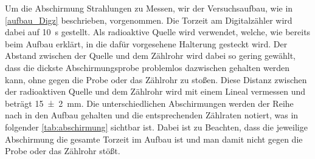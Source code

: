 \documentclass[12pt,english,ngerman]{scrartcl}
\begin{document}
Um die Abschirmung Strahlungen zu Messen, wir der Versuchsaufbau, wie in
\autoref{aufbau_Digz} beschrieben, vorgenommen. Die Torzeit am Digitalzähler
wird dabei auf \SI{10}{\second} gestellt. Als radioaktive Quelle wird
 verwendet, welche, wie bereits beim Aufbau erklärt, in die
dafür vorgesehene Halterung gesteckt wird. Der Abstand zwischen der Quelle und
dem Zählrohr wird dabei so gering gewählt, dass die dickste Abschirmungsprobe
problemlos dazwischen gehalten werden kann, ohne gegen die Probe oder das
Zählrohr zu stoßen. Diese Distanz zwischen der radioaktiven Quelle und dem
Zählrohr wird mit einem Lineal vermessen und beträgt \SI{15(2)}{\mm}. Die
unterschiedlichen Abschirmungen werden der Reihe nach in den Aufbau gehalten
und die entsprechenden Zählraten notiert, was in folgender
\autoref{tab:abschirmung} sichtbar ist. Dabei ist zu Beachten, dass die
jeweilige Abschirmung die gesamte Torzeit im Aufbau ist und man damit nicht
gegen die Probe oder das Zählrohr stößt.

\begin{table}[H]
  \caption[Erhaltene Zählraten bei verschiedenen Abschirmungsmaterialien]{Erhaltene Zählraten bei
  verschiedenen Abschirmungsmaterialien bei einer Torzeit von \SI{10}{\second} und einem
  Abstand der radioaktiven Quelle von \SI{15(2)}{\mm}. Die Unsicherheit beträgt dabei für alle Zählraten \SI{}{} \\
  \(z_{Luft} \dots\) erhaltene Zählrate ohne Abschirmung \\
  \(z_{\mathrm{Papier}} \dots\) erhaltene Zählrate mit einem Blatt Papier als Abschirmung \\
  \(z_{\mathrm{Lineal}} \dots\) erhaltene Zählrate mit einem Lineal als Abschirmung (Dicke = \SI{2.1(0.05)}{\mm})\\
  \(z_{\mathrm{Kunststoff}} \dots\) erhaltene Zählrate mit einer CD und zugehörigen Soulcase als Abschirmung \\
  \(z_{\mathrm{Alu \num{0.4}}} \dots\) erhaltene Zählrate mit mit einem Aluminiumblech als Abschirmung, Dicke = \SI{0.4(0.05)}{\mm}\\
  \(z_{\mathrm{Alu \num{0.8}}} \dots\) erhaltene Zählrate mit mit einem Aluminiumblech als Abschirmung, Dicke = \SI{0.8(0.05)}{\mm}\\
  \(z_{\mathrm{Alu \num{4}}} \dots\) erhaltene Zählrate mit mit einem Aluminiumblech als Abschirmung, Dicke = \SI{4(0.05)}{\mm}\\
}
  \label{tab:abschirmung}
  \begin{center}
    
  \end{center}
\end{table}
\end{document}
